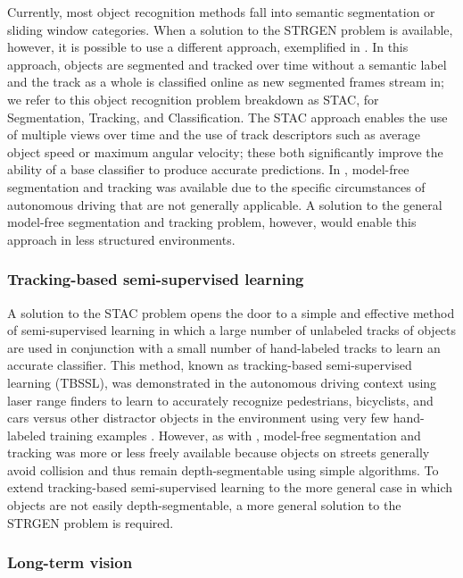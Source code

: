 \documentclass[graybox]{svmult}
\begin{document}
Currently, most object recognition methods fall into semantic segmentation or sliding window categories.  When a solution to the STRGEN problem is available, however, it is possible to use a different approach, exemplified in \cite{teichman2011a}.  In this approach, objects are segmented and tracked over time without a semantic label and the track as a whole is classified online as new segmented frames stream in; we refer to this object recognition problem breakdown as STAC, for Segmentation, Tracking, and Classification.  The STAC approach enables the use of multiple views over time and the use of track descriptors such as average object speed or maximum angular velocity; these both significantly improve the ability of a base classifier to produce accurate predictions.  In \cite{teichman2011a}, model-free segmentation and tracking was available due to the specific circumstances of autonomous driving that are not generally applicable.  A solution to the general model-free segmentation and tracking problem, however, would enable this approach in less structured environments.

\subsubsection{Tracking-based semi-supervised learning}

A solution to the STAC problem opens the door to a simple and effective method of semi-supervised learning in which a large number of unlabeled tracks of objects are used in conjunction with a small number of hand-labeled tracks to learn an accurate classifier.  This method, known as tracking-based semi-supervised learning (TBSSL), was demonstrated in the autonomous driving context using laser range finders to learn to accurately recognize pedestrians, bicyclists, and cars versus other distractor objects in the environment using very few hand-labeled training examples \cite{teichman2011b}. However, as with \cite{teichman2011a}, model-free segmentation and tracking was more or less freely available because objects on streets generally avoid collision and thus remain depth-segmentable using simple algorithms.  To extend tracking-based semi-supervised learning to the more general case in which objects are not easily depth-segmentable, a more general solution to the STRGEN problem is required.

\subsubsection{Long-term vision}
\end{document}
